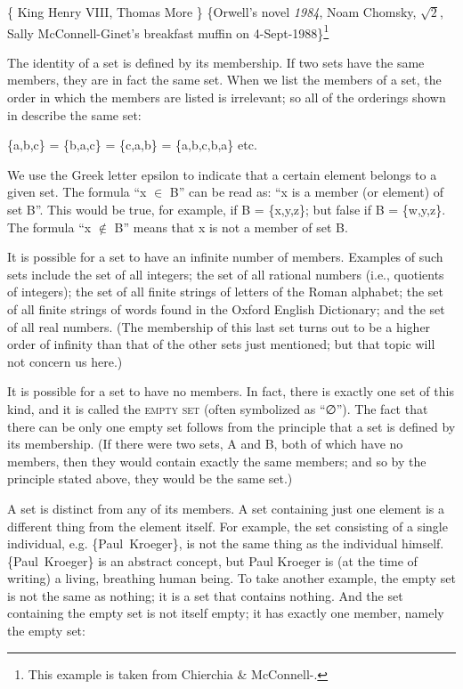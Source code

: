 \ea \label{ex:13.2}
\ea \{ King Henry VIII, Thomas More \}
\ex  \{Orwell’s novel \textit{1984}, Noam Chomsky, $\sqrt{2}$, Sally McConnell-Ginet’s breakfast muffin on 4-Sept-1988\}\footnote{This example is taken from Chierchia \& McConnell-\citet[431]{Ginet1990}.}
\z
\z


The identity of a set is defined by its membership. If two sets have the same members, they are in fact the same set. When we list the members of a set, the order in which the members are listed is irrelevant; so all of the orderings shown in  describe the same set:


\ea \label{ex:13.3}
\{a,b,c\} = \{b,a,c\} = \{c,a,b\} = \{a,b,c,b,a\} etc. 
\z


We use the Greek letter epsilon to indicate that a certain element belongs to a given set. The formula “x ${\in}$ B” can be read as: “x is a member (or element) of set B”. This would be true, for example, if B = \{x,y,z\}; but false if B = \{w,y,z\}. The formula “x ${\notin}$ B” means that x is not a member of set B.



It is possible for a set to have an infinite number of members. Examples of such sets include the set of all integers; the set of all rational numbers (i.e., quotients of integers); the set of all finite strings of letters of the Roman alphabet; the set of all finite strings of words found in the Oxford English Dictionary; and the set of all real numbers. (The membership of this last set turns out to be a higher order of infinity than that of the other sets just mentioned; but that topic will not concern us here.)



It is possible for a set to have no members. In fact, there is exactly one set of this kind, and it is called the \textsc{empty set} (often symbolized as “∅”). The fact that there can be only one empty set follows from the principle that a set is defined by its membership. (If there were two sets, A and B, both of which have no members, then they would contain exactly the same members; and so by the principle stated above, they would be the same set.)



A set is distinct from any of its members. A set containing just one element is a different thing from the element itself. For example, the set consisting of a single individual, e.g. \{Paul~Kroeger\}, is not the same thing as the individual himself. \{Paul~Kroeger\} is an abstract concept, but Paul Kroeger is (at the time of writing) a living, breathing human being. To take another example, the empty set is not the same as nothing; it is a set that contains nothing. And the set containing the empty set is not itself empty; it has exactly one member, namely the empty set:


